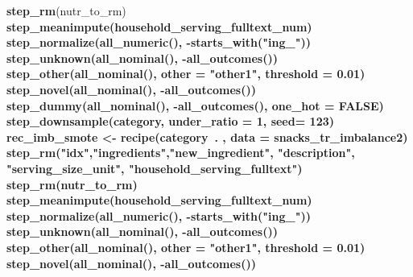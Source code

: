\documentclass[
]{article}
\newenvironment{Shaded}{\begin{snugshade}}{\end{snugshade}}
\newcommand{\DataTypeTok}[1]{\textcolor[rgb]{0.13,0.29,0.53}{#1}}
\newcommand{\DecValTok}[1]{\textcolor[rgb]{0.00,0.00,0.81}{#1}}
\newcommand{\FloatTok}[1]{\textcolor[rgb]{0.00,0.00,0.81}{#1}}
\newcommand{\KeywordTok}[1]{\textcolor[rgb]{0.13,0.29,0.53}{\textbf{#1}}}
\newcommand{\NormalTok}[1]{#1}
\newcommand{\OperatorTok}[1]{\textcolor[rgb]{0.81,0.36,0.00}{\textbf{#1}}}
\newcommand{\OtherTok}[1]{\textcolor[rgb]{0.56,0.35,0.01}{#1}}
\newcommand{\StringTok}[1]{\textcolor[rgb]{0.31,0.60,0.02}{#1}}
\begin{document}
\begin{Shaded}
\begin{Highlighting}[]
{{{{{{{{{{{\StringTok{  }\KeywordTok{step_rm}\NormalTok{(nutr_to_rm) }\OperatorTok{%>%}
\StringTok{  }\KeywordTok{step_meanimpute}\NormalTok{(household_serving_fulltext_num) }\OperatorTok{%>%}
\StringTok{  }\KeywordTok{step_normalize}\NormalTok{(}\KeywordTok{all_numeric}\NormalTok{(), }\OperatorTok{-}\KeywordTok{starts_with}\NormalTok{(}\StringTok{"ing_"}\NormalTok{)) }\OperatorTok{%>%}
\StringTok{  }\KeywordTok{step_unknown}\NormalTok{(}\KeywordTok{all_nominal}\NormalTok{(), }\OperatorTok{-}\KeywordTok{all_outcomes}\NormalTok{()) }\OperatorTok{%>%}
\StringTok{  }\KeywordTok{step_other}\NormalTok{(}\KeywordTok{all_nominal}\NormalTok{(), }\DataTypeTok{other =} \StringTok{"other1"}\NormalTok{, }\DataTypeTok{threshold =} \FloatTok{0.01}\NormalTok{) }\OperatorTok{%>%}
\StringTok{  }\KeywordTok{step_novel}\NormalTok{(}\KeywordTok{all_nominal}\NormalTok{(), }\OperatorTok{-}\KeywordTok{all_outcomes}\NormalTok{()) }\OperatorTok{%>%}
\StringTok{  }\KeywordTok{step_dummy}\NormalTok{(}\KeywordTok{all_nominal}\NormalTok{(), }\OperatorTok{-}\KeywordTok{all_outcomes}\NormalTok{(), }\DataTypeTok{one_hot =} \OtherTok{FALSE}\NormalTok{) }\OperatorTok{%>%}\StringTok{ }
\StringTok{  }\KeywordTok{step_downsample}\NormalTok{(category, }\DataTypeTok{under_ratio =} \DecValTok{1}\NormalTok{, }\DataTypeTok{seed=} \DecValTok{123}\NormalTok{)}
\NormalTok{rec_imb_smote <-}\StringTok{ }\KeywordTok{recipe}\NormalTok{(category}\OperatorTok{~}\NormalTok{. , }\DataTypeTok{data =}\NormalTok{ snacks_tr_imbalance2) }\OperatorTok{%>%}
\StringTok{  }\KeywordTok{step_rm}\NormalTok{(}\StringTok{"idx"}\NormalTok{,}\StringTok{"ingredients"}\NormalTok{,}\StringTok{"new_ingredient"}\NormalTok{, }\StringTok{"description"}\NormalTok{, }\StringTok{"serving_size_unit"}\NormalTok{, }\StringTok{"household_serving_fulltext"}\NormalTok{) }\OperatorTok{%>%}
\StringTok{  }\KeywordTok{step_rm}\NormalTok{(nutr_to_rm) }\OperatorTok{%>%}
\StringTok{  }\KeywordTok{step_meanimpute}\NormalTok{(household_serving_fulltext_num) }\OperatorTok{%>%}
\StringTok{  }\KeywordTok{step_normalize}\NormalTok{(}\KeywordTok{all_numeric}\NormalTok{(), }\OperatorTok{-}\KeywordTok{starts_with}\NormalTok{(}\StringTok{"ing_"}\NormalTok{)) }\OperatorTok{%>%}
\StringTok{  }\KeywordTok{step_unknown}\NormalTok{(}\KeywordTok{all_nominal}\NormalTok{(), }\OperatorTok{-}\KeywordTok{all_outcomes}\NormalTok{()) }\OperatorTok{%>%}
\StringTok{  }\KeywordTok{step_other}\NormalTok{(}\KeywordTok{all_nominal}\NormalTok{(), }\DataTypeTok{other =} \StringTok{"other1"}\NormalTok{, }\DataTypeTok{threshold =} \FloatTok{0.01}\NormalTok{) }\OperatorTok{%>%}
\StringTok{  }\KeywordTok{step_novel}\NormalTok{(}\KeywordTok{all_nominal}\NormalTok{(), }\OperatorTok{-}\KeywordTok{all_outcomes}\NormalTok{()) }\OperatorTok{%>%}
}}}}}}}}}}}}}}}}}}}}}}}}}}
\end{Highlighting}
\end{Shaded}
\end{document}
